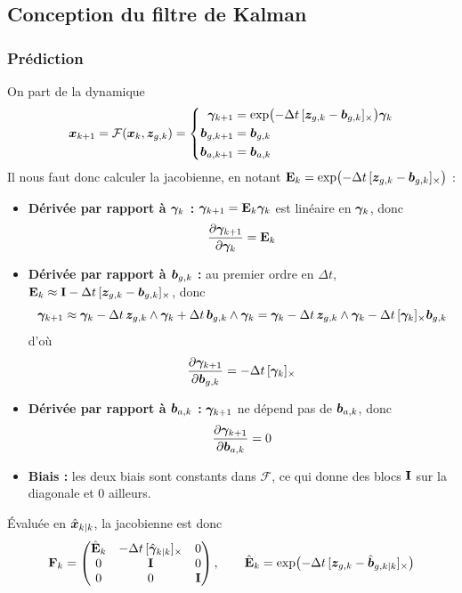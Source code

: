 \subsection{Conception du filtre de Kalman}
\subsubsection{Prédiction}
On part de la dynamique 
\[
    \bm{x}_{k+1} = \mathcal{F}(\bm{x}_k, \bm{z}_{g,k}) =
    \left\{\begin{aligned}
        \bm{\gamma}_{k+1} &= \exp\bigl(-\Delta t\,[\bm{z}_{g,k} - \bm{b}_{g,k}]_{\times}\bigr)\bm{\gamma}_k\\
        \bm{b}_{g,k+1} &= \bm{b}_{g,k}\\
        \bm{b}_{a,k+1} &= \bm{b}_{a,k}
    \end{aligned}\right.
\]
Il nous faut donc calculer la jacobienne, en notant
$\mathbf{E}_k = \exp\bigl(-\Delta t\,[\bm{z}_{g,k} - \bm{b}_{g,k}]_{\times}\bigr)$ :
\begin{itemize}
    \item \textbf{Dérivée par rapport à $\bm{\gamma}_k$ : } $\bm{\gamma}_{k+1} = \mathbf{E}_k\bm{\gamma}_k$ est linéaire en $\bm{\gamma}_k$, donc
    \[
        \frac{\partial \bm{\gamma}_{k+1}}{\partial \bm{\gamma}_k} = \mathbf{E}_k
    \]
    \item \textbf{Dérivée par rapport à $\bm{b}_{g,k}$ : } au premier ordre en $\Delta t$, $\mathbf{E}_k \approx \mathbf{I} - \Delta t\,[\bm{z}_{g,k} - \bm{b}_{g,k}]_{\times}$, donc
    \[
        \bm{\gamma}_{k+1} \approx \bm{\gamma}_k - \Delta t\,\bm{z}_{g,k}\wedge\bm{\gamma}_k + \Delta t\,\bm{b}_{g,k}\wedge\bm{\gamma}_k
        = \bm{\gamma}_k - \Delta t\,\bm{z}_{g,k}\wedge\bm{\gamma}_k - \Delta t\,[\bm{\gamma}_k]_{\times}\bm{b}_{g,k}
    \]
    d'où
    \[
        \frac{\partial \bm{\gamma}_{k+1}}{\partial \bm{b}_{g,k}} = -\Delta t\,[\bm{\gamma}_k]_{\times}
    \]
    \item \textbf{Dérivée par rapport à $\bm{b}_{a,k}$ : } $\bm{\gamma}_{k+1}$ ne dépend pas de $\bm{b}_{a,k}$, donc
    \[
        \frac{\partial \bm{\gamma}_{k+1}}{\partial \bm{b}_{a,k}} = 0
    \]
    \item \textbf{Biais : } les deux biais sont constants dans $\mathcal{F}$, ce qui donne des blocs $\mathbf{I}$ sur la diagonale et $0$ ailleurs.
\end{itemize}
Évaluée en $\hat{\bm{x}}_{k|k}$, la jacobienne est donc
\[
    \mathbf{F}_k = \begin{pmatrix}
        \hat{\mathbf{E}}_k & -\Delta t\,[\hat{\bm{\gamma}}_{k|k}]_{\times} & 0\\
        0 & \mathbf{I} & 0\\
        0 & 0 & \mathbf{I}
    \end{pmatrix},
    \qquad
    \hat{\mathbf{E}}_k = \exp\bigl(-\Delta t\,[\bm{z}_{g,k} - \hat{\bm{b}}_{g,k|k}]_{\times}\bigr)
\]
